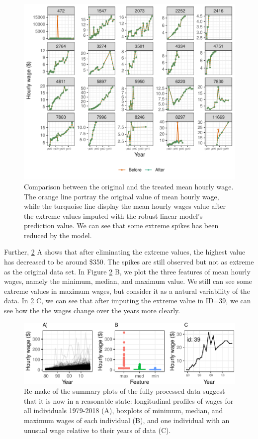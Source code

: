 \documentclass{article}
\begin{document}
\begin{figure}

{\centering \includegraphics[width=432px]{figures/compare-plot-1} 

}

\caption{Comparison between the original and the treated mean hourly wage. The orange line portray the original value of mean hourly wage, while the turquoise line display the mean hourly wages value after the extreme values imputed with the robust linear model's prediction value. We can see that some extreme spikes has been reduced by the model.}\label{fig:compare-plot}
\end{figure}

Further, \ref{fig:fixed-feature-plot} A shows that after eliminating the extreme values, the highest value has decreased to be around \$350. The spikes are still observed but not as extreme as the original data set. In Figure \ref{fig:fixed-feature-plot} B, we plot the three features of mean hourly wages, namely the minimum, median, and maximum value. We still can see some extreme values in maximum wages, but consider it as a natural variability of the data. In \ref{fig:fixed-feature-plot} C, we can see that after imputing the extreme value in ID=39, we can see how the the wages change over the years more clearly.

\begin{figure}

{\centering \includegraphics[width=432px]{figures/fixed-feature-plot-1} 

}

\caption{Re-make of the summary plots of the fully processed data suggest that it is now in a reasonable state: longitudinal profiles of wages for all individuals 1979-2018 (A), boxplots of minimum, median, and maximum wages of each individual (B), and one individual with an unusual wage relative to their years of data (C). }\label{fig:fixed-feature-plot}
\end{figure}
\end{document}
